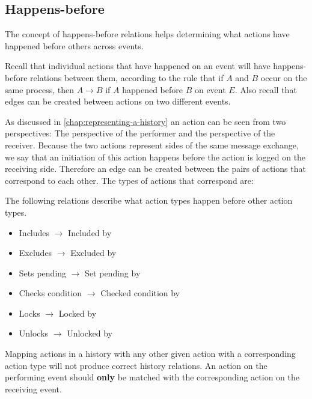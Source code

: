 	\subsection{Happens-before}
	The concept of happens-before relations helps determining what actions have happened before others across events.
	
	Recall that individual actions that have happened on an event will have happens-before relations between them, according to the rule that if $A$ and $B$ occur on the same process, then $A \rightarrow B$ if $A$ happened before $B$ on event $E$.
	Also recall that edges can be created between actions on two different events.
	
	
	\newpar As discussed in \autoref{chap:representing-a-history} an action can be seen from two perspectives: The perspective of the performer and the perspective of the receiver.
	Because the two actions represent sides of the same message exchange, we say that an initiation of this action happens before the action is logged on the receiving side. Therefore an edge can be created between the pairs of actions that correspond to each other. The types of actions that correspond are:
	
	\begin{definition}
		The following relations describe what action types happen before other action types.
			\begin{itemize}
				\item Includes $\rightarrow$ Included by
				\item Excludes $\rightarrow$ Excluded by
				\item Sets pending $\rightarrow$ Set pending by
				\item Checks condition $\rightarrow$ Checked condition by
				\item Locks $\rightarrow$ Locked by
				\item Unlocks $\rightarrow$ Unlocked by
			\end{itemize}
			\label{def:happensbeforeaction}
	\end{definition}
	

	\newpar Mapping actions in a history with any other given action with a corresponding action type will not produce correct history relations. 
	An action on the performing event should \textbf{only} be matched with the corresponding action on the receiving event. 
	
